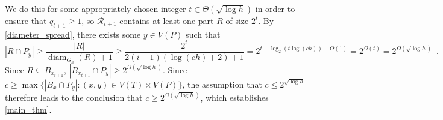 \documentclass{patmorin}
\DeclareMathOperator{\diam}{diam}
\renewcommand{\le}{\leqslant}
\renewcommand{\ge}{\geqslant}
\begin{document}
We do this for some appropriately chosen integer $t\in\Theta(\sqrt{\log h})$ in order to ensure that $q_{t+1}\ge 1$, so $\mathcal{R}_{t+1}$ contains at least one part $R$ of size $2^t$.
%
%
%
%
%
By \cref{diameter_spread}, there exists some $y \in V(P)$ such that
\[
  |R\cap P_y| \ge \frac{|R|}{\diam_{G_h}(R)+1} \ge \frac{2^t}{2(i-1)(\log(ch)+2)+1}
  = 2^{t-\log_2(t\log(ch))-O(1)} =  2^{\Omega(t)} = 2^{\Omega(\sqrt{\log h})} \enspace .
\]
Since $R\subseteq B_{x_{t+1}}$, $|B_{x_{t+1}}\cap P_y|\ge 2^{\Omega(\sqrt{\log h})}$. Since $c\ge \max\{|B_x\cap P_y|:(x,y)\in V(T)\times V(P)\}$, the assumption that $c\le 2^{\sqrt{\log h}}$ therefore leads to the conclusion that $c\ge 2^{\Omega(\sqrt{\log h})}$, which establishes \cref{main_thm}.
\end{document}
